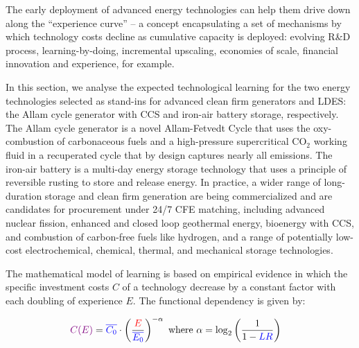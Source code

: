 \documentclass[pdflatex,sn-basic, Numbered]{sn-jnl}
\theoremstyle{thmstyleone}%
\theoremstyle{thmstyletwo}%
\theoremstyle{thmstylethree}%
\begin{document}
The early deployment of advanced energy technologies can help them drive down along the \enquote{experience curve} -- a concept encapsulating a set of mechanisms by which technology costs decline as cumulative capacity is deployed: evolving R\&D process, learning-by-doing, incremental upscaling, economies of scale, financial innovation and experience, for example.

In this section, we analyse the expected technological learning for the two energy technologies selected as stand-ins for advanced clean firm generators and LDES: the Allam cycle generator with CCS and iron-air battery storage, respectively. The Allam cycle generator is a novel Allam-Fetvedt Cycle that uses the oxy-combustion of carbonaceous fuels and a high-pressure supercritical CO$_2$ working fluid in a recuperated cycle that by design captures nearly all emissions. The iron-air battery is a multi-day energy storage technology that uses a principle of reversible rusting to store and release energy. In practice, a wider range of long-duration storage and clean firm generation are being commercialized and are candidates for procurement under 24/7 CFE matching, including advanced nuclear fission, enhanced and closed loop geothermal energy, bioenergy with CCS, and combustion of carbon-free fuels like hydrogen, and a range of potentially low-cost electrochemical, chemical, thermal, and mechanical storage technologies.

The mathematical model of learning is based on empirical evidence in which the speciﬁc investment costs $C$ of a technology decrease by a constant factor with each doubling of experience $E$. The functional dependency is given by:

\begin{equation}
  \begin{aligned}
    \color{violet}C(E)\color{black} &= \color{blue}\overline{C_0}\color{black}  \cdot \left( \frac{\color{red}E}{\color{blue}\overline{E_0}\color{black}} \right)^{-\color{black}\alpha} \text{ where } \color{black}\alpha = \color{black}\log_2 \left( \frac{1}{1 - \color{blue}LR\color{black}} \right)
    \label{eq:learning_curve}
  \end{aligned}
\end{equation}
\end{document}
